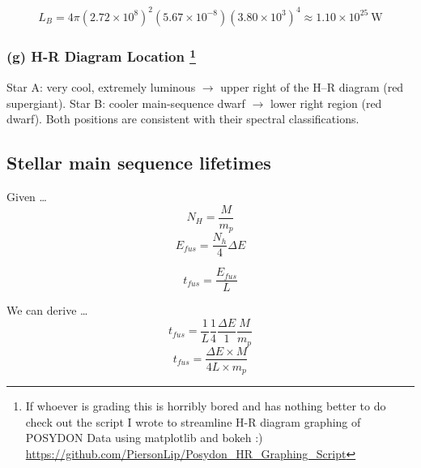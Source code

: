 \documentclass{article}
\begin{document}
\[
L_B = 4\pi(2.72\times10^{8})^2(5.67\times10^{-8})(3.80\times10^{3})^4
     \approx 1.10\times10^{25}~\mathrm{W}
\]

\subsubsection*{(g) H-R Diagram Location \footnote{If whoever is grading this is horribly bored and has nothing better to do check out the script I wrote to streamline H-R diagram graphing of POSYDON Data using matplotlib and bokeh :) \url{https://github.com/PiersonLip/Posydon_HR_Graphing_Script} }}

Star A: very cool, extremely luminous $\rightarrow$ upper right of the H–R diagram (red supergiant).  
Star B: cooler main-sequence dwarf $\rightarrow$ lower right region (red dwarf).  
Both positions are consistent with their spectral classifications.

\begin{table}[htbp]
\end{table}


\subsection{Stellar main sequence lifetimes}
Given \dots
\begin{equation}
    N_H = \frac{M}{m_p} 
    \tag{15.52}
\end{equation}
\begin{equation}
    E_{fus} = \frac{N_h}{4}\Delta E
    \tag{15.53}
\end{equation}

\begin{equation}
    t_{fus} = \frac{E_{fus}}{L}
    \tag{15.54}
\end{equation}

We can derive \dots
    \[t_{fus} = \frac{1}{L} \frac{1}{4} \frac{\Delta E}{1} \frac{M}{m_p}\]
    \[t_{fus} = \frac{\Delta E \times M}{4L\times m_p}\]
\end{document}
